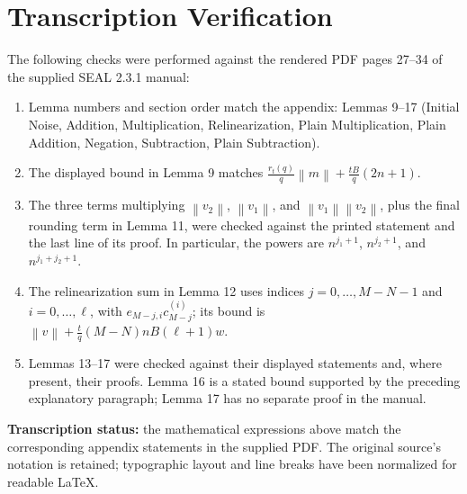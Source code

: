 \documentclass[11pt]{article}
\newcommand{\norm}[1]{\left\lVert #1\right\rVert}
\begin{document}
\section*{Transcription Verification}

The following checks were performed against the rendered PDF pages
27--34 of the supplied SEAL 2.3.1 manual:

\begin{enumerate}[leftmargin=2em]
\item Lemma numbers and section order match the appendix: Lemmas 9--17
      (Initial Noise, Addition, Multiplication, Relinearization,
      Plain Multiplication, Plain Addition, Negation, Subtraction,
      Plain Subtraction).
\item The displayed bound in Lemma 9 matches
      $\frac{r_t(q)}{q}\norm{m}+\frac{tB}{q}(2n+1)$.
\item The three terms multiplying $\norm{v_2}$, $\norm{v_1}$, and
      $\norm{v_1}\norm{v_2}$, plus the final rounding term in Lemma 11,
      were checked against the printed statement and the last line
      of its proof. In particular, the powers are $n^{j_1+1}$,
      $n^{j_2+1}$, and $n^{j_1+j_2+1}$.
\item The relinearization sum in Lemma 12 uses indices
      $j=0,\ldots,M-N-1$ and $i=0,\ldots,\ell$, with
      $e_{M-j,i}c_{M-j}^{(i)}$; its bound is
      $\norm{v}+\frac{t}{q}(M-N)nB(\ell+1)w$.
\item Lemmas 13--17 were checked against their displayed statements
      and, where present, their proofs. Lemma 16 is a stated bound
      supported by the preceding explanatory paragraph; Lemma 17
      has no separate proof in the manual.
\end{enumerate}

\textbf{Transcription status:} the mathematical expressions above
match the corresponding appendix statements in the supplied PDF.
The original source's notation is retained; typographic layout and
line breaks have been normalized for readable LaTeX.
\end{document}
